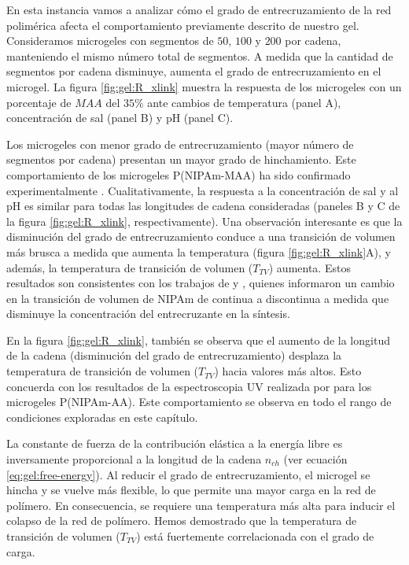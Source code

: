 En esta instancia vamos a analizar c\'omo el grado de entrecruzamiento de la red polim\'erica afecta el comportamiento previamente descrito de nuestro gel. Consideramos microgeles con segmentos de $50$, $100$ y $200$ por cadena, manteniendo el mismo n\'umero total de segmentos. A medida que la cantidad de segmentos por cadena disminuye, aumenta el grado de entrecruzamiento en el microgel. La figura \ref{fig:gel:R_xlink} muestra la respuesta de los microgeles con un porcentaje de $MAA$ del $35\%$ ante cambios de temperatura (panel A), concentraci\'on de sal (panel B) y pH (panel C).

Los microgeles con menor grado de entrecruzamiento (mayor n\'umero de segmentos por cadena) presentan un mayor grado de hinchamiento. Este comportamiento de los microgeles P(NIPAm-MAA) ha sido confirmado experimentalmente \cite{khan2013preparation}. Cualitativamente, la respuesta a la concentraci\'on de sal y al pH es similar para todas las longitudes de cadena consideradas (paneles B y C de la figura \ref{fig:gel:R_xlink}, respectivamente). Una observaci\'on interesante es que la disminuci\'on del grado de entrecruzamiento conduce a una transici\'on de volumen m\'as brusca a medida que aumenta la temperatura (figura \ref{fig:gel:R_xlink}A), y adem\'as, la temperatura de transici\'on de volumen ($T_{TV}$) aumenta. Estos resultados son consistentes con los trabajos de \citet{li1989study} y \citet{wu1997volume}, quienes informaron un cambio en la transici\'on de volumen de NIPAm de continua a discontinua a medida que disminuye la concentraci\'on del entrecruzante en la s\'intesis.

En la figura \ref{fig:gel:R_xlink}, tambi\'en se observa que el aumento de la longitud de la cadena (disminuci\'on del grado de entrecruzamiento) desplaza la temperatura de transici\'on de volumen ($T_{TV}$) hacia valores m\'as altos. Esto concuerda con los resultados de la espectroscopia UV realizada por \citet{Lee2008} para los microgeles P(NIPAm-AA). Este comportamiento se observa en todo el rango de condiciones exploradas en este cap\'itulo.

La constante de fuerza de la contribuci\'on el\'astica a la energ\'ia libre es inversamente proporcional a la longitud de la cadena $n_{ch}$ (ver ecuaci\'on \ref{eq:gel:free-energy}). Al reducir el grado de entrecruzamiento, el microgel se hincha y se vuelve m\'as flexible, lo que permite una mayor carga en la red de pol\'imero. En consecuencia, se requiere una temperatura m\'as alta para inducir el colapso de la red de pol\'imero. Hemos demostrado que la temperatura de transici\'on de volumen ($T_{TV}$) est\'a fuertemente correlacionada con el grado de carga.

